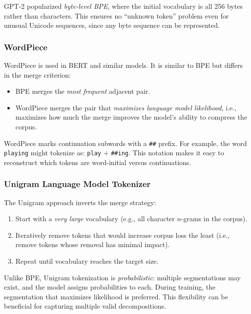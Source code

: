 GPT-2 popularized \emph{byte-level BPE}, where the initial vocabulary is all 256 bytes rather than characters. This ensures no ``unknown token'' problem even for unusual Unicode sequences, since any byte sequence can be represented.

\subsubsection*{WordPiece}

WordPiece is used in BERT and similar models. It is similar to BPE but differs in the merge criterion:

\begin{itemize}
  \item BPE merges the \emph{most frequent} adjacent pair.
  \item WordPiece merges the pair that \emph{maximizes language model likelihood}, i.e., maximizes how much the merge improves the model's ability to compress the corpus.
\end{itemize}

WordPiece marks continuation subwords with a \texttt{\#\#} prefix. For example, the word \texttt{playing} might tokenize as: \texttt{play} + \texttt{\#\#ing}. This notation makes it easy to reconstruct which tokens are word-initial versus continuations.

\subsubsection*{Unigram Language Model Tokenizer}

The Unigram approach inverts the merge strategy:

\begin{enumerate}
  \item Start with a \emph{very large} vocabulary (e.g., all character $n$-grams in the corpus).
  \item Iteratively remove tokens that would increase corpus loss the least (i.e., remove tokens whose removal has minimal impact).
  \item Repeat until vocabulary reaches the target size.
\end{enumerate}

Unlike BPE, Unigram tokenization is \emph{probabilistic}: multiple segmentations may exist, and the model assigns probabilities to each. During training, the segmentation that maximizes likelihood is preferred. This flexibility can be beneficial for capturing multiple valid decompositions.

